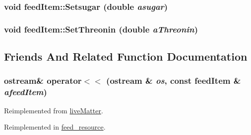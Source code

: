\hypertarget{classfeed_item_a4a4100a9156246db8cfc71f3afb53ead}{
\subsubsection[{Setsugar}]{\setlength{\rightskip}{0pt plus 5cm}void feedItem::Setsugar (double {\em asugar})}}
\label{classfeed_item_a4a4100a9156246db8cfc71f3afb53ead}
\hypertarget{classfeed_item_a66652abe6fd0ac478fc8f8fa62afb3b1}{
\subsubsection[{SetThreonin}]{\setlength{\rightskip}{0pt plus 5cm}void feedItem::SetThreonin (double {\em aThreonin})}}
\label{classfeed_item_a66652abe6fd0ac478fc8f8fa62afb3b1}


\subsection{Friends And Related Function Documentation}
\hypertarget{classfeed_item_ab4c308e0864a941e9652ae997df1142c}{
\subsubsection[{operator$<$$<$}]{\setlength{\rightskip}{0pt plus 5cm}ostream\& operator$<$$<$ (ostream \& {\em os}, \/  const {\bf feedItem} \& {\em afeedItem})}}
\label{classfeed_item_ab4c308e0864a941e9652ae997df1142c}


Reimplemented from \hyperlink{classlive_matter_a694b548b571c88f71f2c7cc75b47d0fb}{liveMatter}.

Reimplemented in \hyperlink{classfeed__resource_aac858c94a22c316b401e81352546407e}{feed\_\-resource}.

